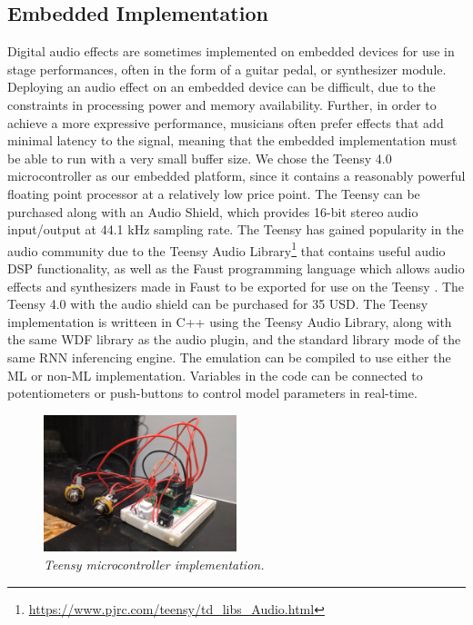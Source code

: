 \documentclass[twoside,a4paper]{article}
\begin{document}
\subsection{Embedded Implementation}
Digital audio effects are sometimes implemented on embedded devices
for use in stage performances, often in the form of a guitar pedal,
or synthesizer module. Deploying an audio effect on an embedded device
can be difficult, due to the constraints in processing power and memory
availability. Further, in order to achieve a more expressive performance,
musicians often prefer effects that add minimal latency to the signal,
meaning that the embedded implementation must be able to run with a
very small buffer size.
\newline\newline
We chose the Teensy 4.0 microcontroller as our embedded platform, since
it contains a reasonably powerful floating point processor at a relatively
low price point. The Teensy can be purchased along with an Audio Shield,
which provides 16-bit stereo audio input/output at 44.1 kHz sampling rate.
The Teensy has gained popularity in the audio community due to
the Teensy Audio Library\footnote{\url{https://www.pjrc.com/teensy/td_libs_Audio.html}}
that contains useful audio DSP functionality, as well as the Faust
programming language which allows audio effects and synthesizers made in
Faust to be exported for use on the Teensy \cite{Michon2019RealTA}.
The Teensy 4.0 with the audio shield can be purchased for 35 USD.
\newline\newline
The Teensy implementation is writteen in C++ using the Teensy Audio Library,
along with the same WDF library as the audio plugin, and the standard
library mode of the same RNN inferencing engine. The emulation can be compiled
to use either the ML or non-ML implementation. Variables in the code can be
connected to potentiometers or push-buttons to control model parameters in real-time.
%
\begin{figure}
    \centering
    \includegraphics[width=0.5\textwidth]{Teensy.jpg}
    \caption{\label{fig:Teensy} {\it Teensy microcontroller implementation.}}
\end{figure}
\end{document}
